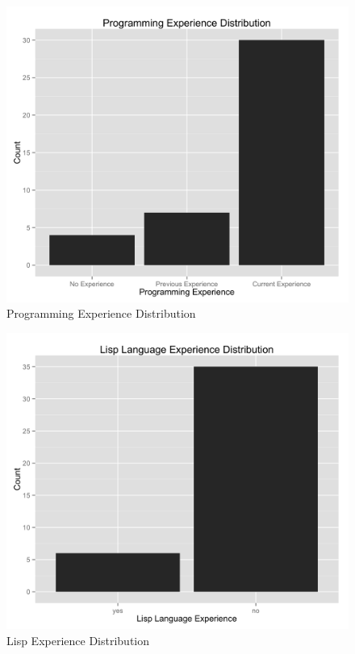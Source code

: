 \begin{figure}
    \centering
    \includegraphics[width=1.0\linewidth]{../study-2/results/graphs/programming.png}
    \caption{Programming Experience Distribution}
    \label{programmingdistribution}
\end{figure}

\begin{figure}
    \centering
    \includegraphics[width=1.0\linewidth]{../study-2/results/graphs/lisp.png}
    \caption{Lisp Experience Distribution}
    \label{lispdistribution}
\end{figure}

